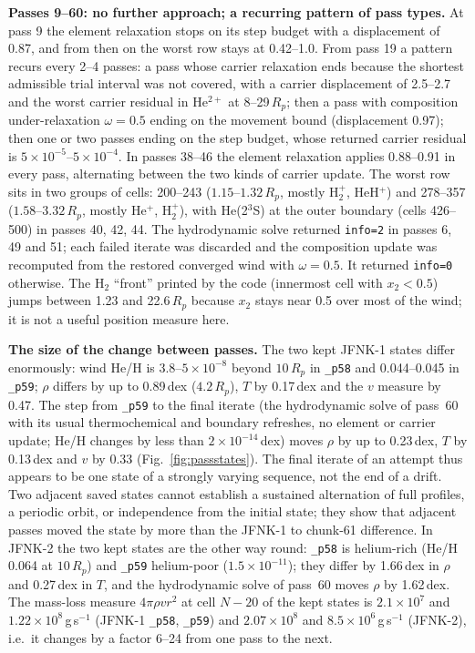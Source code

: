 \documentclass[english,a4paper]{my_memo}
\newcommand{\Rp}{R_p}
\begin{document}
\textbf{Passes 9--60: no further approach; a recurring pattern of pass types.} At pass 9 the
element relaxation stops on its step budget with a displacement of 0.87,
and from then on the worst row stays at 0.42--1.0. From pass 19 a pattern
recurs every 2--4 passes: a pass whose carrier relaxation ends because the
shortest admissible trial interval was not covered, with a carrier
displacement of 2.5--2.7 and the worst carrier residual in He$^{2+}$ at
8--29\,$\Rp$; then a pass with composition under-relaxation $\omega=0.5$
ending on the movement bound (displacement 0.97); then one or two passes
ending on the step budget, whose returned carrier residual is
$5\times10^{-5}$--$5\times10^{-4}$. In passes 38--46 the element
relaxation applies 0.88--0.91 in every pass, alternating between the two
kinds of carrier update. The worst row sits in two groups of cells: 200--243
($1.15$--$1.32\,\Rp$, mostly H$_2^+$, HeH$^+$) and 278--357
($1.58$--$3.32\,\Rp$, mostly He$^+$, H$_2^+$), with He(2$^3$S) at the outer
boundary (cells 426--500) in passes 40, 42, 44. The hydrodynamic solve
returned \texttt{info=2} in passes 6, 49 and 51; each failed iterate was
discarded and the composition update was recomputed from the restored
converged wind with $\omega=0.5$. It returned \texttt{info=0} otherwise. The H$_2$ ``front''
printed by the code (innermost cell with $x_2<0.5$) jumps between 1.23 and
22.6\,$\Rp$ because $x_2$ stays near 0.5 over most of the wind; it is not a
useful position measure here.

\textbf{The size of the change between passes.} The two kept JFNK-1 states differ
enormously: wind He/H is $3.8$--$5\times10^{-8}$ beyond $10\,\Rp$ in
\texttt{\_p58} and 0.044--0.045 in \texttt{\_p59}; $\rho$ differs by up to
0.89\,dex ($4.2\,\Rp$), $T$ by 0.17\,dex and the $v$ measure by 0.47.
The step from \texttt{\_p59} to the final iterate (the hydrodynamic solve
of pass~60 with its usual thermochemical and boundary refreshes, no element
or carrier update; He/H changes by less than $2\times10^{-14}$\,dex) moves $\rho$ by up to 0.23\,dex, $T$ by
0.13\,dex and $v$ by 0.33 (Fig.~\ref{fig:passstates}). The final iterate of an attempt thus appears to be one state of a
strongly varying sequence, not the end of a drift. Two adjacent saved states
cannot establish a sustained alternation of full profiles, a periodic
orbit, or independence from the initial state; they show that adjacent
passes moved the state by more than the JFNK-1 to chunk-61 difference.
In JFNK-2 the two kept states are the other way round: \texttt{\_p58} is
helium-rich (He/H 0.064 at $10\,\Rp$) and \texttt{\_p59} helium-poor
($1.5\times10^{-11}$); they differ by 1.66\,dex in $\rho$ and 0.27\,dex in
$T$, and the hydrodynamic solve of pass~60 moves $\rho$ by 1.62\,dex. The
mass-loss measure $4\pi\rho v r^2$ at cell $N-20$ of the kept states is
$2.1\times10^7$ and $1.22\times10^8$\,g\,s$^{-1}$ (JFNK-1 \texttt{\_p58},
\texttt{\_p59}) and $2.07\times10^8$ and $8.5\times10^6$\,g\,s$^{-1}$
(JFNK-2), i.e.\ it changes by a factor 6--24 from one pass to the next.
\end{document}
